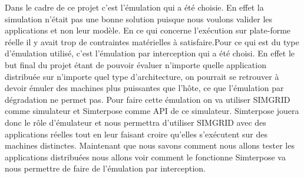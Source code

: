 Dans le cadre de ce projet c'est l'émulation qui a été choisie. En effet la simulation n'était pas une bonne solution puisque nous voulons valider les applications et non leur modèle. En ce qui concerne l'exécution sur plate-forme réelle il y avait trop de contraintes matérielles à satisfaire.Pour ce qui est du type d'émulation utilisé, c'est l'émulation par interception qui a été choisi. En effet le but final du projet étant de pouvoir évaluer n'importe quelle application distribuée sur n'importe quel type d'architecture, on pourrait se retrouver à devoir émuler des machines plus puissantes que l'hôte, ce que l'émulation par dégradation ne permet pas. Pour faire cette émulation on va utiliser SIMGRID comme simulateur et Simterpose comme API de ce simulateur. Simterpose jouera donc le rôle d'émulateur et nous permettra d'utiliser SIMGRID avec des applications réelles tout en leur faisant croire qu'elles s'exécutent sur des machines distinctes. Maintenant que nous savons comment nous allons tester les applications distribuées nous allons voir comment le fonctionne Simterpose va nous permettre de faire de l'émulation par interception.
